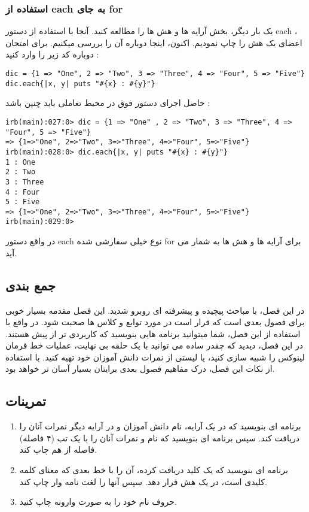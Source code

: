 \documentclass[11pt]{article}
\begin{document}
\subsubsection{استفاده از each به جای for}
یک بار دیگر، بخش آرایه ها و هش ها را مطالعه کنید. آنجا با استفاده از دستور each ، اعضای یک هش را چاپ نمودیم. اکنون، اینجا دوباره آن را بررسی میکنیم. برای امتحان دوباره کد زیر را وارد کنید :
\begin{latin}
\begin{verbatim}
dic = {1 => "One", 2 => "Two", 3 => "Three", 4 => "Four", 5 => "Five"}
dic.each{|x, y| puts "#{x} : #{y}"}
\end{verbatim}
\end{latin}
حاصل اجرای دستور فوق در محیط تعاملی باید چنین باشد :
\begin{latin}
\begin{verbatim}
irb(main):027:0> dic = {1 => "One" , 2 => "Two", 3 => "Three", 4 => "Four", 5 => "Five"}
=> {1=>"One", 2=>"Two", 3=>"Three", 4=>"Four", 5=>"Five"}
irb(main):028:0> dic.each{|x, y| puts "#{x} : #{y}"}
1 : One
2 : Two
3 : Three
4 : Four
5 : Five
=> {1=>"One", 2=>"Two", 3=>"Three", 4=>"Four", 5=>"Five"}
irb(main):029:0>
\end{verbatim}
\end{latin}
در واقع دستور each نوع خیلی سفارشی شده for برای آرایه ها و هش ها به شمار می آید. 
\subsection{جمع بندی}
در این فصل، با مباحث پیچیده و پیشرفته ای روبرو شدید. این فصل مقدمه بسیار خوبی برای فصول بعدی است که قرار است در مورد توابع و کلاس ها صحبت شود. در واقع با استفاده از این فصل، شما میتوانید برنامه هایی بنویسید که کاربردی تر از پیش هستند. در این فصل، دیدید که چقدر ساده می توانید با یک حلقه بی نهایت، عملیات خط فرمان لینوکس را شبیه سازی کنید، یا لیستی از نمرات دانش آموزان خود تهیه کنید. با استفاده از نکات این فصل، درک مفاهیم فصول بعدی برایتان بسیار آسان تر خواهد بود. 
\subsection{تمرینات}
\begin{enumerate}
\item برنامه ای بنویسید که در یک آرایه، نام دانش آموزان و در آرایه دیگر نمرات آنان را دریافت کند. سپس برنامه ای بنویسید که نام و نمرات آنان را با یک تب (۴ فاصله) فاصله از هم چاپ کند.
\item برنامه ای بنویسید که یک کلید دریافت کرده، آن را با خط بعدی که معنای کلمه کلیدی است، در یک هش قرار دهد. سپس آنها را لغت نامه وار چاپ کند.
\item حروف نام خود را به صورت وارونه چاپ کنید. 
\end{enumerate}
\newpage{}
\end{document}
